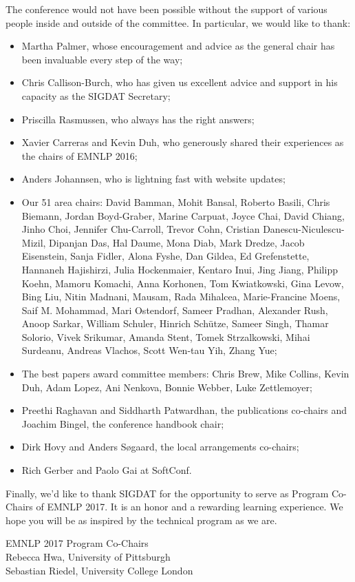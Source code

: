 \pagebreak
The conference would not have been possible without the support of various people inside and outside of the committee. In particular, we would like to thank:

\begin{itemize}
 
\item Martha Palmer, whose encouragement and advice as the general chair has been invaluable every step of the way;
\item Chris Callison-Burch, who has given us excellent advice and support in his capacity as the SIGDAT Secretary;
\item Priscilla Rasmussen, who always has the right answers;
\item Xavier Carreras and Kevin Duh, who generously shared their experiences as the chairs of EMNLP 2016; 
\item Anders Johannsen, who is lightning fast with website updates;
\item Our 51 area chairs:  David Bamman, Mohit Bansal, Roberto Basili, Chris Biemann, Jordan Boyd-Graber, Marine Carpuat, Joyce Chai, David Chiang, Jinho Choi, Jennifer Chu-Carroll, Trevor Cohn, Cristian Danescu-Niculescu-Mizil, Dipanjan Das, Hal Daume, Mona Diab, Mark Dredze, Jacob Eisenstein, Sanja Fidler, Alona Fyshe, Dan Gildea, Ed Grefenstette, Hannaneh Hajishirzi, Julia Hockenmaier, Kentaro Inui, Jing Jiang, Philipp Koehn, Mamoru Komachi, Anna Korhonen, Tom Kwiatkowski, Gina Levow, Bing Liu, Nitin Madnani, Mausam, Rada Mihalcea, Marie-Francine Moens, Saif M. Mohammad, Mari Ostendorf, Sameer Pradhan, Alexander Rush, Anoop Sarkar, William Schuler, Hinrich Schütze, Sameer Singh, Thamar Solorio, Vivek Srikumar, Amanda Stent, Tomek Strzalkowski, Mihai Surdeanu, Andreas Vlachos, Scott Wen-tau Yih, Zhang Yue;
\item The best papers award committee members: Chris Brew, Mike Collins, Kevin Duh, Adam Lopez, Ani Nenkova, Bonnie Webber, Luke Zettlemoyer;
\item Preethi Raghavan and Siddharth Patwardhan, the publications co-chairs and Joachim Bingel, the conference handbook chair;
\item Dirk Hovy and Anders Søgaard, the local arrangements co-chairs;
\item Rich Gerber and Paolo Gai at SoftConf.
 
\end{itemize}
Finally, we’d like to thank SIGDAT for the opportunity to serve as Program Co-Chairs of EMNLP 2017. It is an honor and a rewarding learning experience. We hope you will be as inspired by the technical program as we are. 

\vspace{3em}

\noindent EMNLP 2017 Program Co-Chairs \\
Rebecca Hwa, University of Pittsburgh\\
Sebastian Riedel, University College London

